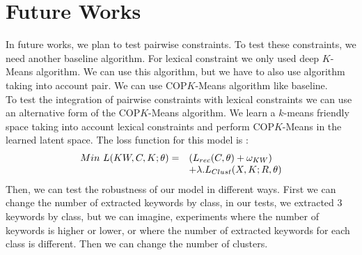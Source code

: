 \section{Future Works}
In future works, we plan to test pairwise constraints.
To test these  constraints, we need another baseline algorithm. For
lexical constraint we only used deep $K$-Means algorithm. We can use this
algorithm, but we have to also use algorithm taking into account pair. We can 
use COP$K$-Means algorithm like baseline.\\ 
To test the integration of pairwise constraints with lexical constraints we can 
use an alternative form of the  COP$K$-Means algorithm. We learn a $k$-means 
friendly space taking into account lexical constraints and perform COP$K$-Means
in the learned latent space. The loss function for this model is :
\begin{equation}
\begin{array}{l l}
  Min~L(KW, C, K; \theta) = &(L_{rec}(C, \theta) + \omega_{KW} )
\\ & + \lambda.L_{Clust}(X, K;R, \theta)
\end{array}
\end{equation}
Then, we can test the robustness of our model in different ways.
First we can change the number of extracted keywords by class, in
our tests, we extracted 3 keywords by class, but we can imagine, experiments 
where the number of keywords is higher or lower, or where the number of 
extracted keywords for each class is different. Then we can change the number
of clusters.